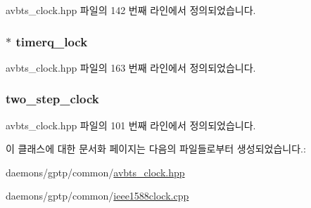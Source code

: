 avbts\+\_\+clock.\+hpp 파일의 142 번째 라인에서 정의되었습니다.

\subsubsection[{\texorpdfstring{timerq\+\_\+lock}{timerq_lock}}]{$\ast$ timerq\+\_\+lock\hspace{0.3cm}{\ttfamily [private]}}\hypertarget{class_i_e_e_e1588_clock_ad5be8ae90ecd7c06aafab66d0d02b4b8}{}\label{class_i_e_e_e1588_clock_ad5be8ae90ecd7c06aafab66d0d02b4b8}


avbts\+\_\+clock.\+hpp 파일의 163 번째 라인에서 정의되었습니다.

\subsubsection[{\texorpdfstring{two\+\_\+step\+\_\+clock}{two_step_clock}}]{ two\+\_\+step\+\_\+clock\hspace{0.3cm}{\ttfamily [private]}}\hypertarget{class_i_e_e_e1588_clock_a4bfd082080c406f15069386b6d26d7c3}{}\label{class_i_e_e_e1588_clock_a4bfd082080c406f15069386b6d26d7c3}


avbts\+\_\+clock.\+hpp 파일의 101 번째 라인에서 정의되었습니다.



이 클래스에 대한 문서화 페이지는 다음의 파일들로부터 생성되었습니다.\+:\begin{DoxyCompactItemize}
\item 
daemons/gptp/common/\hyperlink{avbts__clock_8hpp}{avbts\+\_\+clock.\+hpp}\item 
daemons/gptp/common/\hyperlink{ieee1588clock_8cpp}{ieee1588clock.\+cpp}\end{DoxyCompactItemize}
